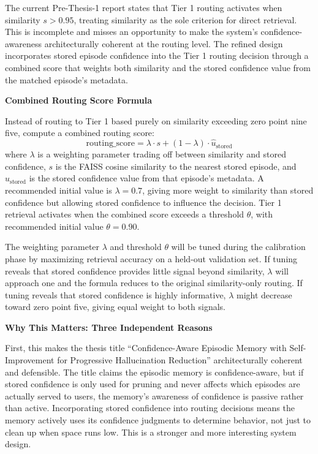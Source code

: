 \documentclass[11pt,a4paper]{article}
\newcommand{\architecturebox}[2]{%
\begin{tcolorbox}[enhanced,breakable,
  colback=LightTeal,colframe=Teal,boxrule=1.5pt,arc=4pt,
  left=8pt,right=8pt,top=6pt,bottom=6pt,
  title={\bfseries\small\color{white}#1},
  attach boxed title to top left={yshift=-2mm,xshift=6mm},
  boxed title style={colback=Teal,arc=3pt,boxrule=0pt,
    left=4pt,right=4pt,top=2pt,bottom=2pt}]
#2
\end{tcolorbox}}
\newcommand{\ustored}{\hat{u}_{\text{stored}}}
\begin{document}
\architecturebox{ARCHITECTURE UPDATE 5: Tier 1 Combined Routing Score Incorporating Stored Episode Confidence}{
The current Pre-Thesis-1 report states that Tier 1 routing activates when similarity $s > 0.95$, treating similarity as the sole criterion for direct retrieval. This is incomplete and misses an opportunity to make the system's confidence-awareness architecturally coherent at the routing level. The refined design incorporates stored episode confidence into the Tier 1 routing decision through a combined score that weights both similarity and the stored confidence value from the matched episode's metadata.

\textbf{Combined Routing Score Formula}

Instead of routing to Tier 1 based purely on similarity exceeding zero point nine five, compute a combined routing score:
\[
\text{routing\_score} = \lambda \cdot s + (1 - \lambda) \cdot \ustored
\]
where $\lambda$ is a weighting parameter trading off between similarity and stored confidence, $s$ is the FAISS cosine similarity to the nearest stored episode, and $\ustored$ is the stored confidence value from that episode's metadata. A recommended initial value is $\lambda = 0.7$, giving more weight to similarity than stored confidence but allowing stored confidence to influence the decision. Tier 1 retrieval activates when the combined score exceeds a threshold $\theta$, with recommended initial value $\theta = 0.90$.

The weighting parameter $\lambda$ and threshold $\theta$ will be tuned during the calibration phase by maximizing retrieval accuracy on a held-out validation set. If tuning reveals that stored confidence provides little signal beyond similarity, $\lambda$ will approach one and the formula reduces to the original similarity-only routing. If tuning reveals that stored confidence is highly informative, $\lambda$ might decrease toward zero point five, giving equal weight to both signals.

\textbf{Why This Matters: Three Independent Reasons}

First, this makes the thesis title ``Confidence-Aware Episodic Memory with Self-Improvement for Progressive Hallucination Reduction'' architecturally coherent and defensible. The title claims the episodic memory is confidence-aware, but if stored confidence is only used for pruning and never affects which episodes are actually served to users, the memory's awareness of confidence is passive rather than active. Incorporating stored confidence into routing decisions means the memory actively uses its confidence judgments to determine behavior, not just to clean up when space runs low. This is a stronger and more interesting system design.

}
\end{document}
